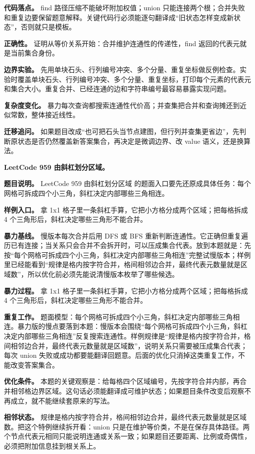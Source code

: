 \textbf{代码落点。} find 路径压缩不能破坏附加权值；union 只能连接两个根；合并失败和重复边要保留题意解释。关键代码行必须能逐句翻译成“旧状态怎样变成新状态”，否则就只是模板。

\textbf{正确性。} 证明从等价关系开始：合并维护连通性的传递性，find 返回的代表元就是当前集合身份。

\textbf{边界实验。} 先用单块石头、行列编号冲突、多个分量、重复坐标做反例检查。实验时覆盖单块石头、行列编号冲突、多个分量、重复坐标，打印每个元素的代表元和集合大小。重复合并、已经连通的边和字符串编号最容易暴露实现问题。

\textbf{复杂度变化。} 暴力每次查询都搜索连通性代价高；并查集把合并和查询摊还到近似常数，整体接近线性。

\textbf{迁移追问。} 如果题目改成“也可把石头当节点建图，但行列并查集更省边”，先判断原状态是否仍然覆盖新答案集合，再决定是微调边界、改 value 语义，还是换算法。

\noindent\textbf{LeetCode 959 由斜杠划分区域。}

\textbf{题目说明。} LeetCode 959 由斜杠划分区域 的题面入口要先还原成具体任务：每个网格可拆成四个小三角，斜杠决定内部哪些三角相连。

\textbf{样例入口。} 拿 1x1 格子里一条斜杠手算，它把小方格分成两个区域；把每格拆成 4 个三角形后，斜杠决定哪些三角形不能合并。

\textbf{暴力基线。} 慢版本每次合并后用 DFS 或 BFS 重新判断连通性。它正确但重复遍历已有连接；当关系只会合并不会拆开时，可以压成集合代表。放到本题就是：先按“每个网格可拆成四个小三角，斜杠决定内部哪些三角相连”完整试慢版本；样例里已经能看到“规律是格内按字符合并，格间相邻边合并，最终代表元数量就是区域数”，所以优化前必须先能说清慢版本枚举了哪些候选。

\textbf{暴力过程。} 拿 1x1 格子里一条斜杠手算，它把小方格分成两个区域；把每格拆成 4 个三角形后，斜杠决定哪些三角形不能合并。

\textbf{重复工作。} 题面模型：每个网格可拆成四个小三角，斜杠决定内部哪些三角相连。暴力版的慢点要落到本题：慢版本会围绕“每个网格可拆成四个小三角，斜杠决定内部哪些三角相连”反复搜索连通性。样例规律是“规律是格内按字符合并，格间相邻边合并，最终代表元数量就是区域数”，说明关系只需要被压成集合代表；每次 union 失败或成功都要能翻译回题意。后面的优化只消掉这类重复工作，不能改变答案集合。

\textbf{优化条件。} 本题的关键观察是：给每格四个区域编号，先按字符合并内部，再合并相邻格边界区域。这句话必须能翻译成可维护状态；如果题目条件改变后观察不再成立，就不能继续套原来的写法。

\textbf{相邻状态。} 规律是格内按字符合并，格间相邻边合并，最终代表元数量就是区域数。把这个特例继续拆开看：union 只是在维护等价类，不是在保存具体路径。两个节点代表元相同只能说明连通或关系一致；如果题目还要距离、比例或奇偶性，必须把附加信息挂到根关系上。

